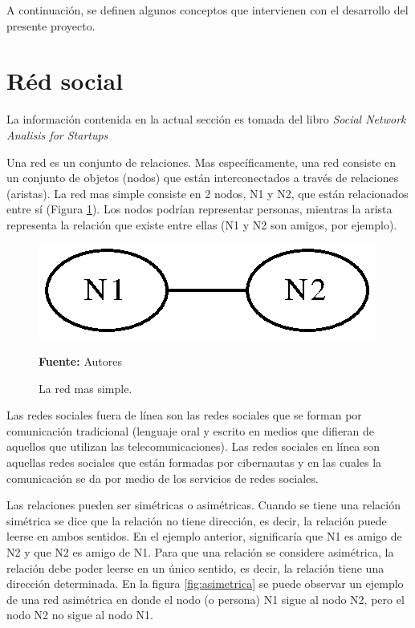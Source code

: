 A continuación, se definen algunos conceptos que intervienen con el desarrollo del presente proyecto.





\section{Réd social}

La información contenida en la actual sección es tomada del libro \textit{Social Network Analisis for Startups} \cite{sna_startups}

Una red es un conjunto de relaciones. Mas específicamente, una red consiste en un conjunto de objetos (nodos) que están interconectados a través de relaciones (aristas). La red mas simple consiste en 2 nodos, N1 y N2, que están relacionados entre sí (Figura \ref{fig:simple}). Los nodos podrían representar personas, mientras la arista representa la relación que existe entre ellas (N1 y N2 son amigos, por ejemplo).

\begin{figure}[!htb]
  \begin{center}
    \includegraphics{./imagenes/Red_simple.eps}
    \caption{La red mas simple.}
    \label{fig:simple}
    \textbf{Fuente:}  Autores
  \end{center}
\end{figure}

Las redes sociales fuera de línea son las redes sociales que se forman por comunicación tradicional (lenguaje oral y escrito en medios que difieran de aquellos que utilizan las telecomunicaciones). Las redes sociales en línea son aquellas redes sociales que están formadas por cibernautas y en las cuales la comunicación se da por medio de los servicios de redes sociales. \cite{analysis}

Las relaciones pueden ser simétricas o asimétricas. Cuando se tiene una relación simétrica se dice que la relación no tiene dirección, es decir, la relación puede leerse en ambos sentidos. En el ejemplo anterior, significaría que N1 es amigo de N2 y que N2 es amigo de N1. Para que una relación se considere asimétrica, la relación debe poder leerse en un único sentido, es decir, la relación tiene una dirección determinada. En la figura \ref{fig:asimetrica} se puede observar un ejemplo de una red asimétrica en donde el nodo (o persona) N1 sigue al nodo N2, pero el nodo N2 no sigue al nodo N1.

